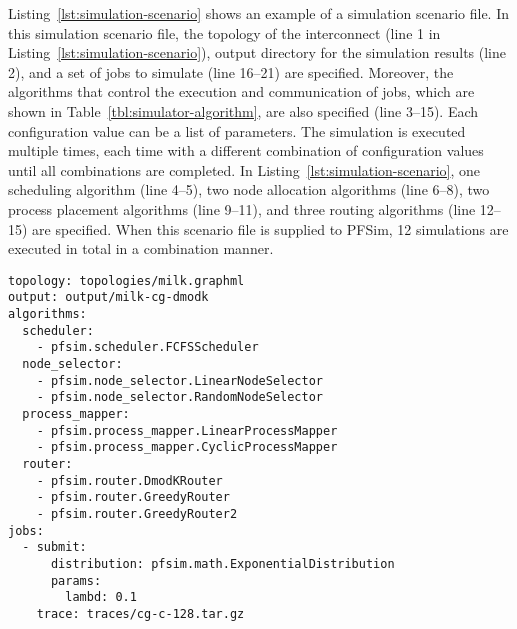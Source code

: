 Listing~\ref{lst:simulation-scenario} shows an example of a simulation
scenario file. In this simulation scenario file, the topology of the
interconnect (line 1 in Listing~\ref{lst:simulation-scenario}), output
directory for the simulation results (line 2), and a set of jobs to simulate
(line 16--21) are specified. Moreover, the algorithms that control the
execution and communication of jobs, which are shown in
Table~\ref{tbl:simulator-algorithm}, are also specified (line 3--15). Each
configuration value can be a list of parameters. The simulation is executed
multiple times, each time with a different combination of configuration values
until all combinations are completed. In
Listing~\ref{lst:simulation-scenario}, one scheduling algorithm (line 4--5),
two node allocation algorithms (line 6--8), two process placement algorithms
(line 9--11), and three routing algorithms (line 12--15) are specified. When
this scenario file is supplied to PFSim, 12 simulations are executed in total
in a combination manner.

\begin{lstlisting}[caption={Example of a Simulation Scenario},%
                   label={lst:simulation-scenario}, linewidth={\columnwidth},%
                   float={htbp}]
topology: topologies/milk.graphml
output: output/milk-cg-dmodk
algorithms:
  scheduler:
    - pfsim.scheduler.FCFSScheduler
  node_selector:
    - pfsim.node_selector.LinearNodeSelector
    - pfsim.node_selector.RandomNodeSelector
  process_mapper:
    - pfsim.process_mapper.LinearProcessMapper
    - pfsim.process_mapper.CyclicProcessMapper
  router:
    - pfsim.router.DmodKRouter
    - pfsim.router.GreedyRouter
    - pfsim.router.GreedyRouter2
jobs:
  - submit:
      distribution: pfsim.math.ExponentialDistribution
      params:
        lambd: 0.1
    trace: traces/cg-c-128.tar.gz
\end{lstlisting}

